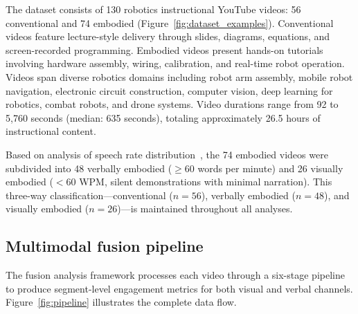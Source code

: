 \documentclass[fleqn,10pt]{wlscirep}
\begin{document}
The dataset consists of 130 robotics instructional YouTube videos: 56 conventional and 74 embodied (Figure~\ref{fig:dataset_examples}). Conventional videos feature lecture-style delivery through slides, diagrams, equations, and screen-recorded programming. Embodied videos present hands-on tutorials involving hardware assembly, wiring, calibration, and real-time robot operation. Videos span diverse robotics domains including robot arm assembly, mobile robot navigation, electronic circuit construction, computer vision, deep learning for robotics, combat robots, and drone systems. Video durations range from 92 to 5{,}760 seconds (median: 635 seconds), totaling approximately 26.5 hours of instructional content.

Based on analysis of speech rate distribution~\cite{zhang2025transcript}, the 74 embodied videos were subdivided into 48 verbally embodied ($\geq 60$ words per minute) and 26 visually embodied ($< 60$ WPM, silent demonstrations with minimal narration). This three-way classification---conventional ($n = 56$), verbally embodied ($n = 48$), and visually embodied ($n = 26$)---is maintained throughout all analyses.

\subsection*{Multimodal fusion pipeline}

The fusion analysis framework processes each video through a six-stage pipeline to produce segment-level engagement metrics for both visual and verbal channels. Figure~\ref{fig:pipeline} illustrates the complete data flow.
\end{document}

